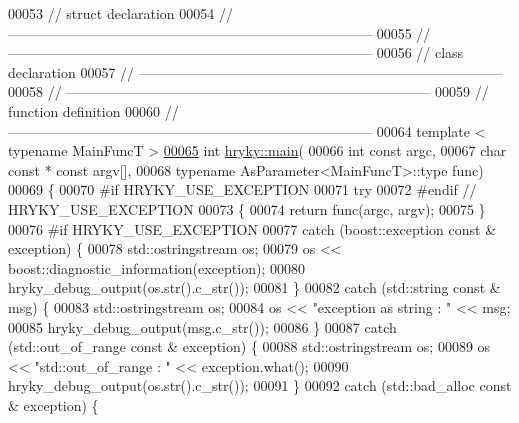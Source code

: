 \begin{DoxyCode}
00053 \textcolor{comment}{// struct declaration}
00054 \textcolor{comment}{//
      ------------------------------------------------------------------------------}
00055 \textcolor{comment}{//
      ------------------------------------------------------------------------------}
00056 \textcolor{comment}{// class declaration}
00057 \textcolor{comment}{//
      ------------------------------------------------------------------------------}
00058 \textcolor{comment}{//
      ------------------------------------------------------------------------------}
00059 \textcolor{comment}{// function definition}
00060 \textcolor{comment}{//
      ------------------------------------------------------------------------------}
00064 \textcolor{comment}{}\textcolor{keyword}{template} < \textcolor{keyword}{typename} MainFuncT >
\hypertarget{main_8h_source_l00065}{}\hyperlink{namespacehryky_acf43d20e6c0b5e4b54931d42b46443a1}{00065} \textcolor{keywordtype}{int} \hyperlink{namespacehryky_acf43d20e6c0b5e4b54931d42b46443a1}{hryky::main}(
00066     \textcolor{keywordtype}{int} \textcolor{keyword}{const} argc,
00067     \textcolor{keywordtype}{char} \textcolor{keyword}{const} * \textcolor{keyword}{const} argv[],
00068     \textcolor{keyword}{typename} AsParameter<MainFuncT>::type func)
00069 \{
00070 \textcolor{preprocessor}{#if HRYKY\_USE\_EXCEPTION}
00071 \textcolor{preprocessor}{}    \textcolor{keywordflow}{try}
00072 \textcolor{preprocessor}{#endif // HRYKY\_USE\_EXCEPTION}
00073 \textcolor{preprocessor}{}    \{
00074         \textcolor{keywordflow}{return} func(argc, argv);
00075     \}
00076 \textcolor{preprocessor}{#if HRYKY\_USE\_EXCEPTION}
00077 \textcolor{preprocessor}{}    \textcolor{keywordflow}{catch} (boost::exception \textcolor{keyword}{const} & exception) \{
00078         std::ostringstream os;
00079         os << boost::diagnostic\_information(exception);
00080         hryky\_debug\_output(os.str().c\_str());
00081     \}
00082     \textcolor{keywordflow}{catch} (std::string \textcolor{keyword}{const} & msg) \{
00083         std::ostringstream os;
00084         os << \textcolor{stringliteral}{"exception as string : "} << msg;
00085         hryky\_debug\_output(msg.c\_str());
00086     \}
00087     \textcolor{keywordflow}{catch} (std::out\_of\_range \textcolor{keyword}{const} & exception) \{
00088         std::ostringstream os;
00089         os << \textcolor{stringliteral}{"std::out\_of\_range : "} << exception.what();
00090         hryky\_debug\_output(os.str().c\_str());
00091     \}
00092     \textcolor{keywordflow}{catch} (std::bad\_alloc \textcolor{keyword}{const} & exception) \{

\end{DoxyCode}
